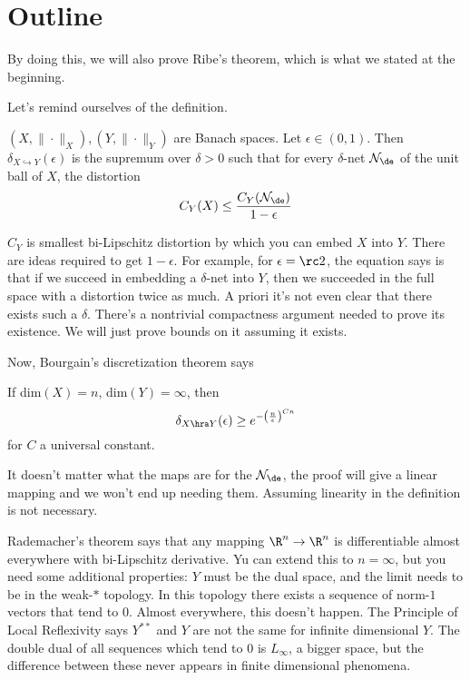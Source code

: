 \section{Outline}

By doing this, we will also prove Ribe's theorem, which is what we stated at the beginning. 

Let's remind ourselves of the definition.

\begin{df*}
$(X, \|\cdot\|_X), (Y, \|\cdot\|_Y)$ are Banach spaces. Let $\epsilon \in (0, 1)$. Then $\delta_{X \hookrightarrow Y}(\epsilon)$ is the supremum over $\delta > 0$ such that for every $\delta$-net $\cal N_{\de}$ of the unit ball of $X$, the distortion 
\[
C_Y(X) \leq \frac{C_Y(\cal N_{\de})}{1 - \epsilon}
\]
\end{df*}
$C_Y$ is smallest bi-Lipschitz distortion by which you can embed $X$ into $Y$. There are ideas required to get $1 - \epsilon$. For example, for $\epsilon = \rc2$, the equation says is that if we succeed in embedding a $\delta$-net into $Y$, then we succeeded in the full space with a distortion twice as much. A priori it's not even clear that there exists such a $\delta$. There's a nontrivial compactness argument needed to prove its existence. We will just prove bounds on it assuming it exists. 

Now, Bourgain's discretization theorem says 
\begin{thm*}
If dim$(X) = n$, dim$(Y) = \infty$, then 
\[
\delta_{X \hra Y}(\epsilon) \geq e^{-\left(\frac{n}{\epsilon}\right)^{Cn}}
\]
for $C$ a universal constant. 
\end{thm*}

\begin{rem}
It doesn't matter what the maps are for the $\cal N_\de$, the proof will give a linear mapping and we won't end up needing them. Assuming linearity in the definition is not necessary. 


Rademacher's theorem says that any mapping $\R^n \to \R^n$ is differentiable almost everywhere with bi-Lipschitz derivative. Yu can extend this to $n = \infty$, but you need some additional properties: $Y$ must be the dual space, and the limit needs to be in the weak-$*$ topology. In this topology there exists a sequence of norm-$1$ vectors that tend to $0$. 
Almost everywhere, this doesn't happen. The Principle of Local Reflexivity  says $Y^{**}$ and $Y$ are not the same for infinite dimensional $Y$. The double dual of all sequences which tend to $0$ is $L_{\infty}$, a bigger space, but the difference between these never appears in finite dimensional phenomena. 
\end{rem}

